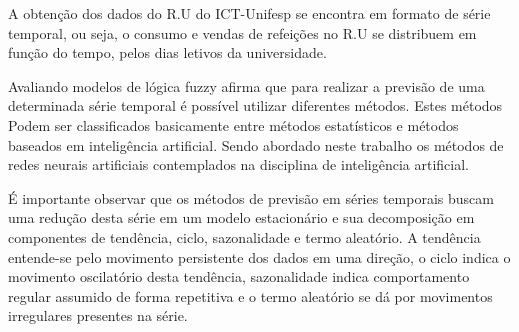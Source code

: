 A obtenção dos dados do R.U do ICT-Unifesp se encontra em formato de série temporal, ou seja, o consumo e vendas de refeições no R.U se distribuem em função do tempo, pelos dias letivos da universidade.

Avaliando modelos de lógica fuzzy  afirma que para realizar a previsão de uma determinada série temporal é possível utilizar diferentes métodos. Estes métodos Podem ser classificados basicamente entre métodos estatísticos e métodos baseados em inteligência artificial. Sendo abordado neste trabalho os métodos de redes neurais artificiais contemplados na disciplina de inteligência artificial.
  
É importante observar que os métodos de previsão em séries temporais buscam uma redução desta série em um modelo estacionário e sua decomposição em componentes de tendência, ciclo, sazonalidade e termo aleatório. A tendência entende-se pelo movimento persistente dos dados em uma direção, o ciclo indica o movimento oscilatório desta tendência, sazonalidade indica comportamento regular assumido de forma repetitiva e o termo aleatório se dá por movimentos irregulares presentes na série.



